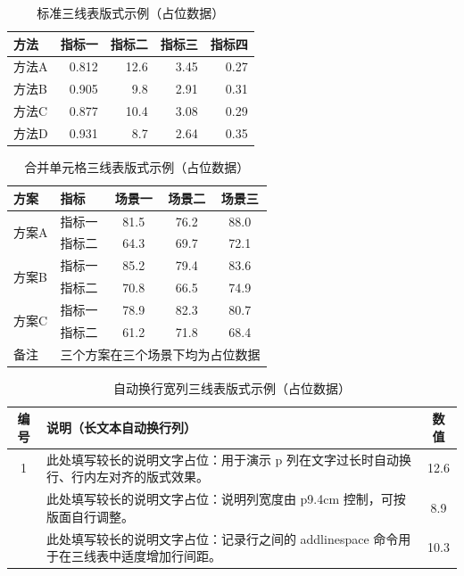 \documentclass{JXUSTmodeling}
\begin{document}
\begin{table}[H]
	\centering
	\small
	\setlength{\tabcolsep}{6pt}
	\caption{标准三线表版式示例（占位数据）}
	\label{tab:booktabs_demo}
	\begin{tabular}{lrrrr}
		\toprule
		方法 & 指标一 & 指标二 & 指标三 & 指标四 \\
		\midrule
		方法A & 0.812 & 12.6 & 3.45 & 0.27 \\
		方法B & 0.905 & 9.8  & 2.91 & 0.31 \\
		方法C & 0.877 & 10.4 & 3.08 & 0.29 \\
		方法D & 0.931 & 8.7  & 2.64 & 0.35 \\
		\bottomrule
	\end{tabular}
\end{table}

\begin{table}[H]
	\centering
	\small
	\setlength{\tabcolsep}{8pt}
	\caption{合并单元格三线表版式示例（占位数据）}
	\label{tab:multirow_demo}
	\begin{tabular}{llccc}
		\toprule
		方案 & 指标 & 场景一 & 场景二 & 场景三 \\
		\midrule
		\multirow{2}{*}{方案A} & 指标一 & 81.5 & 76.2 & 88.0 \\
		& 指标二 & 64.3 & 69.7 & 72.1 \\
		\midrule
		\multirow{2}{*}{方案B} & 指标一 & 85.2 & 79.4 & 83.6 \\
		& 指标二 & 70.8 & 66.5 & 74.9 \\
		\midrule
		\multirow{2}{*}{方案C} & 指标一 & 78.9 & 82.3 & 80.7 \\
		& 指标二 & 61.2 & 71.8 & 68.4 \\
		\midrule
		备注 & \multicolumn{4}{c}{三个方案在三个场景下均为占位数据} \\
		\bottomrule
	\end{tabular}
\end{table}

\begin{table}[H]
	\centering
	\small
	\setlength{\tabcolsep}{4pt}
	\caption{自动换行宽列三线表版式示例（占位数据）}
	\label{tab:pcolumn_demo}
	\begin{tabular}{cp{9.4cm}c}
		\toprule
		编号 & 说明（长文本自动换行列） & 数值 \\
		\midrule
		1 & 此处填写较长的说明文字占位：用于演示 p 列在文字过长时自动换行、行内左对齐的版式效果。 & 12.6 \\
		\addlinespace
		2 & 此处填写较长的说明文字占位：说明列宽度由 p{9.4cm} 控制，可按版面自行调整。 & 8.9 \\
		\addlinespace
		3 & 此处填写较长的说明文字占位：记录行之间的 addlinespace 命令用于在三线表中适度增加行间距。 & 10.3 \\
		\bottomrule
	\end{tabular}
\end{table}
\end{document}
